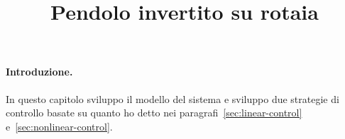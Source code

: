 \title{Pendolo invertito su rotaia}
\label{sec:pic}
\maketitle


\paragraph{Introduzione.}
In questo capitolo sviluppo il modello del sistema e sviluppo due strategie di controllo
basate su quanto ho detto nei paragrafi~\ref{sec:linear-control} e~\ref{sec:nonlinear-control}.
 





